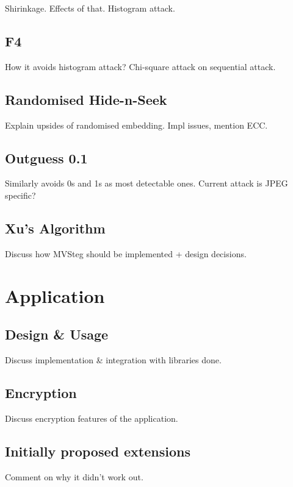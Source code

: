 \documentclass[12pt,british,twoside,notitlepage,usenames,dvipsnames,hypens,final]{report}
\numberwithin{equation}{section}
\numberwithin{figure}{section}
\begin{document}
Shirinkage. Effects of that. Histogram attack.

\subsection{F4}

How it avoids histogram attack? Chi-square attack on sequential attack.

\subsection{Randomised Hide-n-Seek}

Explain upsides of randomised embedding. Impl issues, mention ECC. 

\subsection{Outguess 0.1}

Similarly avoids 0s and 1s as most detectable ones. Current attack is JPEG specific?

\subsection{Xu's Algorithm}
\label{xu-alg}

Discuss how MVSteg should be implemented + design decisions.

\section{Application}

\subsection{Design \& Usage}

Discuss implementation \& integration with libraries done.

\subsection{Encryption}
Discuss encryption features of the application.

\subsection{Initially proposed extensions}
Comment on why it didn't work out.

\end{document}
